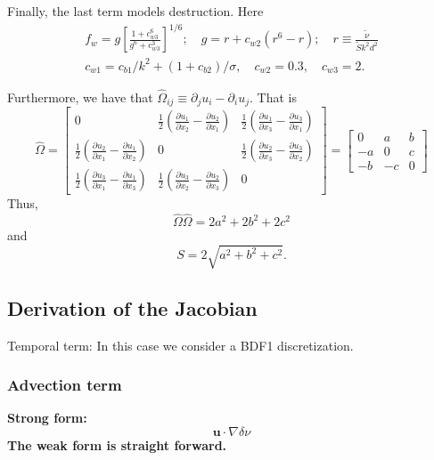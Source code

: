 \documentclass[twoside, 11pt, a4paper]{article}
\begin{document}
Finally, the last term models destruction. Here
\begin{equation}
	\begin{split}
		f_w = g\left[\frac{1+c_{w3}^6}{g^6+c_{w3}^3}\right]^{1/6}; \quad g = r + c_{w2}\left(r^6-r\right); \quad r \equiv \frac{\tilde{\nu}}{\tilde{S}k^2d^2} \\
		c_{w1} = c_{b1}/k^2+(1+c_{b2})/\sigma,\quad c_{w2} = 0.3,\quad c_{w3} = 2.
	\end{split}
\end{equation}

Furthermore, we have that $\hat{\Omega}_{ij} \equiv \partial_j u_i-\partial_i u_j$.
That is
\[
  \hat{\Omega}  = \begin{bmatrix}
                    0 & \frac{1}{2}\left(\frac{\partial u_1}{\partial x_2}-\frac{\partial u_2}{\partial x_1}\right) & \frac{1}{2}\left(\frac{\partial u_1}{\partial x_3}-\frac{\partial u_3}{\partial x_1}\right) \\
                    \frac{1}{2}\left(\frac{\partial u_2}{\partial x_1}-\frac{\partial u_1}{\partial x_2}\right) & 0 & \frac{1}{2}\left(\frac{\partial u_2}{\partial x_3}-\frac{\partial u_3}{\partial x_2}\right) \\
                    \frac{1}{2}\left(\frac{\partial u_3}{\partial x_1}-\frac{\partial u_1}{\partial x_3}\right) & \frac{1}{2}\left(\frac{\partial u_3}{\partial x_2}-\frac{\partial u_2}{\partial x_3}\right) & 0
                  \end{bmatrix} =
                  \begin{bmatrix}
                     0 & a & b \\
                    -a & 0 & c \\
                    -b & -c & 0
                  \end{bmatrix}
\]
Thus,
\[
  \hat{\Omega}\hat{\Omega}  = 2a^2+2b^2+2c^2
\]
and
\[
  S = 2\sqrt{a^2+b^2+c^2}.
\]

\subsection*{Derivation of the Jacobian}
Temporal term: In this case we consider a BDF1 discretization.

\subsubsection*{Advection term}
\bf Strong form:\rm
\begin{equation}
  \mathbf{u}\cdot\nabla\delta\nu
\end{equation}
The weak form is straight forward.
\end{document}
